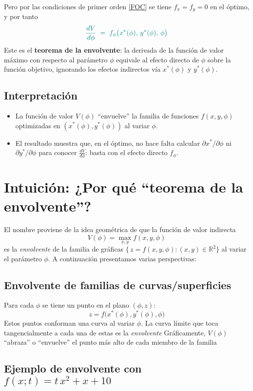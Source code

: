 \documentclass{article}
\newcommand{\R}{\ensuremath{\mathbb{R}}}
\begin{document}
Pero por las condiciones de primer orden \eqref{FOC} se tiene \(f_x=f_y=0\) en el óptimo, y por tanto
\[
\color{teal}
\frac{dV}{d\phi} \;=\; f_\phi\bigl(x^*(\phi),\,y^*(\phi),\,\phi\bigr)
\]
{\color{teal}Este es el \textbf{teorema de la envolvente}: la derivada de la función de valor máximo con respecto al parámetro \(\phi\) equivale al efecto directo de \(\phi\) sobre la función objetivo, ignorando los efectos indirectos vía \(x^*(\phi)\) y \(y^*(\phi)\).}

\subsection*{Interpretación}

\begin{itemize}
  \item La función de valor \(V(\phi)\) “envuelve” la familia de funciones \(f(x,y,\phi)\) optimizadas en \((x^*(\phi),y^*(\phi))\) al variar \(\phi\).
  \item El resultado muestra que, en el óptimo, no hace falta calcular \(\partial x^*/\partial\phi\) ni \(\partial y^*/\partial\phi\) para conocer \(\tfrac{dV}{d\phi}\): basta con el efecto directo \(f_\phi\).
\end{itemize}

\section*{Intuición: ¿Por qué ``teorema de la envolvente''?}

El nombre proviene de la idea geométrica de que la función de valor indirecta
\[
V(\phi)=\max_{x,y}f(x,y,\phi)
\]
es la \emph{envolvente} de la familia de gráficas
\(\{\,z=f(x,y,\phi):(x,y)\in\R^2\}\) al variar el parámetro \(\phi\). A continuación presentamos varias perspectivas:

\subsection*{Envolvente de familias de curvas/superficies}

Para cada \(\phi\) se tiene un punto en el plano \((\phi,z)\):
\[
z = f\bigl(x^*(\phi),y^*(\phi),\phi\bigr)
\]
Estos puntos conforman una curva al variar $\phi$. La curva límite que toca tangencialmente a cada una de estas es la \emph{envolvente}  
Gráficamente, \(V(\phi)\) “abraza” o “envuelve” el punto más alto de cada miembro de la familia


\subsection*{Ejemplo de envolvente con \(f(x;t)=t\,x^2 + x + 10\)}
\end{document}
